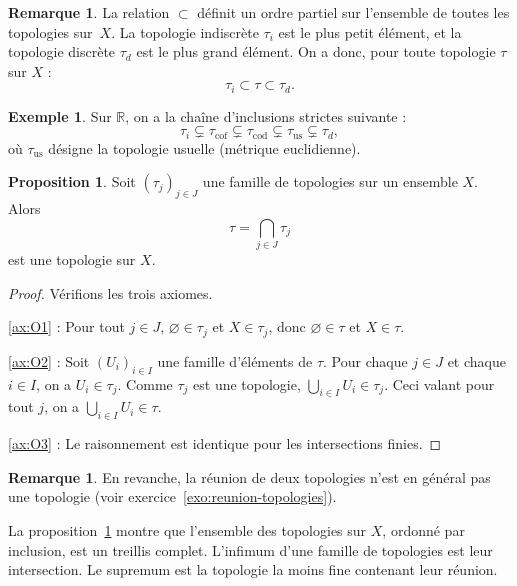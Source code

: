 \documentclass[12pt,a4paper,openany]{book}
\theoremstyle{definition}
\theoremstyle{cours}
\newtheorem{proposition}[theoreme]{Proposition}
\theoremstyle{coursnormal}
\newtheorem{remarque}[theoreme]{Remarque}
\newtheorem{exemple}[theoreme]{Exemple}
\newcommand{\R}{\mathbb{R}}
\begin{document}
\begin{remarque}
  La relation $\subset$ définit un ordre partiel sur l'ensemble de toutes les topologies sur~$X$. La topologie indiscrète $\tau_i$ est le plus petit élément, et la topologie discrète $\tau_d$ est le plus grand élément. On a donc, pour toute topologie $\tau$ sur $X$ :
  \[
    \tau_i \subset \tau \subset \tau_d.
  \]
\end{remarque}

\begin{exemple}\label{ex:comparaison-R}
  Sur $\R$, on a la chaîne d'inclusions strictes suivante :
  \[
    \tau_i \subsetneq \tau_{\mathrm{cof}} \subsetneq \tau_{\mathrm{cod}} \subsetneq \tau_{\mathrm{us}} \subsetneq \tau_d,
  \]
  où $\tau_{\mathrm{us}}$ désigne la topologie usuelle (métrique euclidienne).
\end{exemple}

\begin{proposition}\label{prop:intersection-topologies}
  Soit $({\tau_j})_{j \in J}$ une famille de topologies sur un ensemble $X$. Alors
  \[
    \tau = \bigcap_{j \in J} \tau_j
  \]
  est une topologie sur $X$.
\end{proposition}

\begin{proof}
  Vérifions les trois axiomes.

  \ref{ax:O1} : Pour tout $j \in J$, $\varnothing \in \tau_j$ et $X \in \tau_j$, donc $\varnothing \in \tau$ et $X \in \tau$.

  \ref{ax:O2} : Soit $(U_i)_{i \in I}$ une famille d'éléments de $\tau$. Pour chaque $j \in J$ et chaque $i \in I$, on a $U_i \in \tau_j$. Comme $\tau_j$ est une topologie, $\bigcup_{i \in I} U_i \in \tau_j$. Ceci valant pour tout $j$, on a $\bigcup_{i \in I} U_i \in \tau$.

  \ref{ax:O3} : Le raisonnement est identique pour les intersections finies.
\end{proof}

\begin{remarque}
  En revanche, la réunion de deux topologies n'est en général pas une topologie (voir exercice~\ref{exo:reunion-topologies}).
\end{remarque}

La proposition~\ref{prop:intersection-topologies} montre que l'ensemble des topologies sur $X$, ordonné par inclusion, est un treillis complet. L'infimum d'une famille de topologies est leur intersection. Le supremum est la topologie la moins fine contenant leur réunion.
\end{document}
